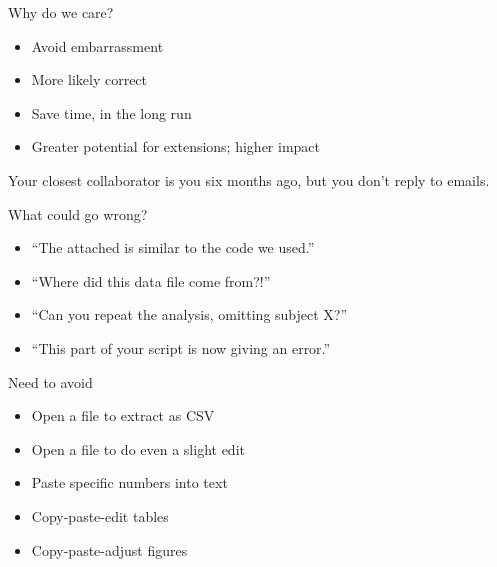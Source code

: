 \documentclass[12pt,t]{beamer}
\newcommand{\bi}{\begin{itemize}}
\newcommand{\ei}{\end{itemize}}
\begin{document}
\begin{frame}{Why do we care?}

\vspace{24pt}

\bi
\itemsep12pt
\item Avoid embarrassment
\item More likely correct
\item Save time, in the long run
\item Greater potential for extensions; higher impact
\ei

\end{frame}


\begin{frame}[c]{}

\centering
\large
Your closest collaborator is you six months ago, but you
don't reply to emails.
\end{frame}


\begin{frame}{What could go wrong?}

\vspace{24pt}

\bi
\itemsep12pt
\item ``The attached is similar to the code we used.''
\item ``Where did this data file come from?!''
\item ``Can you repeat the analysis, omitting subject X?''
\item ``This part of your script is now giving an error.''
\ei

\end{frame}


\begin{frame}{Need to avoid}


\vspace{24pt}

\bi
\itemsep12pt
\item Open a file to extract as CSV
\item Open a file to do even a slight edit
\item Paste specific numbers into text
\item Copy-paste-edit tables
\item Copy-paste-adjust figures
\ei

\end{frame}
\end{document}
